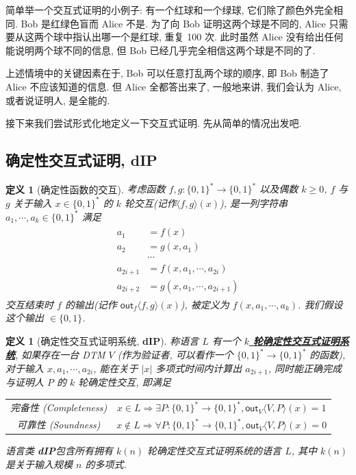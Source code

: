 \documentclass[8pt]{article}
\theoremstyle{compact}
\newtheorem{definition}[theorem]{定义}
\def\obj#1{\textbf{\uline{#1}}}
\def\ge{\geqslant}
\begin{document}
简单举一个交互式证明的小例子: 有一个红球和一个绿球, 它们除了颜色外完全相同. Bob 是红绿色盲而 Alice 不是. 为了向 Bob 证明这两个球是不同的, Alice 只需要从这两个球中指认出哪一个是红球, 重复 100 次. 此时虽然 Alice 没有给出任何能说明两个球不同的信息, 但 Bob 已经几乎完全相信这两个球是不同的了.

上述情境中的关键因素在于, Bob 可以任意打乱两个球的顺序, 即 Bob 制造了 Alice 不应该知道的信息. 但 Alice 全都答出来了, 一般地来讲, 我们会认为 Alice, 或者说证明人, 是全能的.

接下来我们尝试形式化地定义一下交互式证明. 先从简单的情况出发吧.

\def\dIP{\textbf{dIP}}
\subsection{确定性交互式证明, \dIP}
\begin{definition}[确定性函数的交互]
	考虑函数 $f, g: \{0, 1\}^* \to \{0, 1\}^*$ 以及偶数 $k \ge 0$, $f$ 与 $g$ 关于输入 $x \in \{0, 1\}^*$ 的 $k$ 轮交互(记作$\langle f, g\rangle(x)$), 是一列字符串 $a_1, \cdots, a_k \in \{0, 1\}^*$ 满足 \begin{align*}
		\begin{split}
			a_1 &= f(x) \\
			a_2 &= g(x, a_1) \\ 
			&\cdots \\
			a_{2i+1} &= f(x, a_1, \cdots, a_{2i}) \\
			a_{2i+2} &= g(x, a_1, \cdots, a_{2i+1})			
		\end{split}
	\end{align*}
	交互结束时 $f$ 的输出(记作 $\textsf{out}_f\langle f, g \rangle (x)$), 被定义为 $f(x, a_1, \cdots, a_k)$. 我们假设这个输出 $\in \{0, 1\}$.
	\label{deterministic_interaction}
\end{definition}
\begin{definition}[确定性交互式证明系统, \dIP]
	称语言 $L$ 有一个 \obj{$k$ 轮确定性交互式证明系统}, 如果存在一台 DTM $V$ (作为验证者, 可以看作一个 $\{0, 1\}^* \to \{0, 1\}^*$ 的函数), 对于输入 $x, a_1, \cdots, a_{2i}$, 能在关于 $|x|$ 多项式时间内计算出 $a_{2i+1}$, 同时能正确完成与证明人 $P$ 的 $k$ 轮确定性交互, 即满足 \begin{center}
		\begin{tabular}{cc}
			完备性 (Completeness) & $x \in L \Rightarrow \exists P: \{0, 1\}^* \to \{0, 1\}^*, \textsf{out}_V\langle V, P\rangle(x) = 1$ \\
			可靠性 (Soundness) & $x \notin L \Rightarrow \forall P: \{0, 1\}^* \to \{0, 1\}^*, \textsf{out}_V\langle V, P\rangle(x) = 0$ \\
		\end{tabular}
	\end{center}
	语言类 \dIP 包含所有拥有 $k(n)$ 轮确定性交互式证明系统的语言 $L$, 其中 $k(n)$ 是关于输入规模 $n$ 的多项式.
\end{definition}
\end{document}
